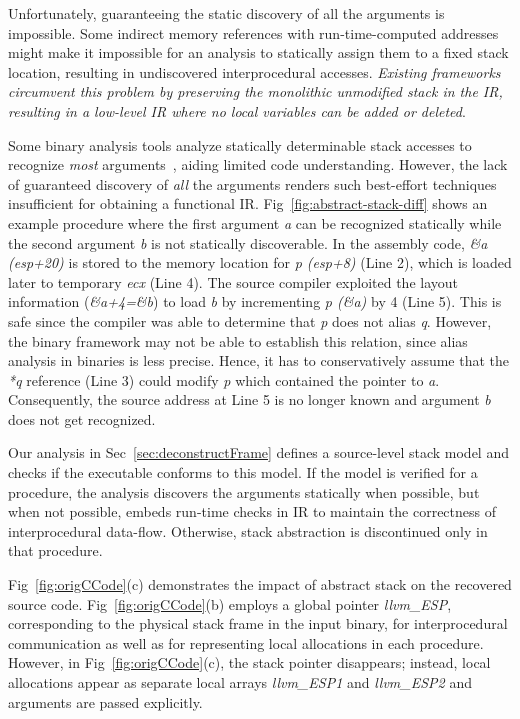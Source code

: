 Unfortunately, guaranteeing the static discovery of all the arguments is impossible. Some indirect memory references with run-time-computed addresses might make it impossible for an analysis to statically assign them to a fixed stack location, resulting in undiscovered interprocedural accesses. \emph{Existing frameworks circumvent this problem by preserving the monolithic unmodified stack in the IR, resulting in a low-level IR where no local variables can be added or deleted}.

Some binary analysis tools analyze statically determinable stack accesses to recognize \emph{most} arguments~\cite{gogul04}, aiding limited code understanding. However, the lack of guaranteed discovery of \emph{all} the arguments renders such best-effort techniques insufficient for obtaining a functional IR. Fig~\ref{fig:abstract-stack-diff} shows an example procedure where the first argument \emph{a} can be recognized statically while the second argument \emph{b} is not statically discoverable. In the assembly code, \emph{\&a (esp+20)} is stored to the memory location for \emph{p (esp+8)} (Line 2), which is loaded later to temporary \emph{ecx} (Line 4). The source compiler exploited the layout information (\emph{\&a+4=\&b}) to load \emph{b} by incrementing \emph{p (\&a)} by 4 (Line 5). This is safe since the compiler was able to determine that \emph{p} does not alias \emph{q}. However, the binary framework may not be able to establish this relation, since alias analysis in binaries is less precise. Hence, it has to conservatively assume that the \emph{*q} reference (Line 3) could modify \emph{p} which contained the pointer to \emph{a}. Consequently, the source address at Line 5 is no longer known and argument \emph{b} does not get recognized.

Our analysis in Sec~\ref{sec:deconstructFrame} defines a source-level stack model and checks if the executable conforms to this model. If the model is verified for a procedure, the analysis discovers the arguments statically when possible, but when not possible, embeds run-time checks in IR to maintain the correctness of interprocedural data-flow. Otherwise, stack abstraction is discontinued only in that procedure.

Fig~\ref{fig:origCCode}(c) demonstrates the impact of abstract stack on the recovered source code. Fig~\ref{fig:origCCode}(b) employs a global pointer \emph{llvm\_ESP}, corresponding to the physical stack frame in the input binary, for interprocedural communication as well as for representing local allocations in each procedure. However, in Fig~\ref{fig:origCCode}(c), the stack pointer disappears; instead, local allocations appear as separate local arrays \emph{llvm\_ESP1} and \emph{llvm\_ESP2} and arguments are passed explicitly.

